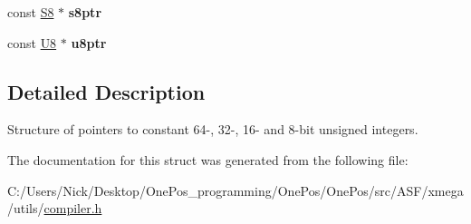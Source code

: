 \begin{DoxyCompactItemize}
\item 
\hypertarget{struct_struct_c_ptr_adf51b808c625ef854e381489d9f30565}{const \hyperlink{group__group__xmega__utils_gaf1475a0bb1962ef08dd1f78bd5dba87a}{S8} $\ast$ {\bfseries s8ptr}}\label{struct_struct_c_ptr_adf51b808c625ef854e381489d9f30565}

\item 
\hypertarget{struct_struct_c_ptr_a34c387e10262411049636a789d0a6a6e}{const \hyperlink{group__group__xmega__utils_gaa63ef7b996d5487ce35a5a66601f3e73}{U8} $\ast$ {\bfseries u8ptr}}\label{struct_struct_c_ptr_a34c387e10262411049636a789d0a6a6e}

\end{DoxyCompactItemize}


\subsection{Detailed Description}
Structure of pointers to constant 64-\/, 32-\/, 16-\/ and 8-\/bit unsigned integers. 

The documentation for this struct was generated from the following file\-:\begin{DoxyCompactItemize}
\item 
C\-:/\-Users/\-Nick/\-Desktop/\-One\-Pos\-\_\-programming/\-One\-Pos/\-One\-Pos/src/\-A\-S\-F/xmega/utils/\hyperlink{compiler_8h}{compiler.\-h}\end{DoxyCompactItemize}
